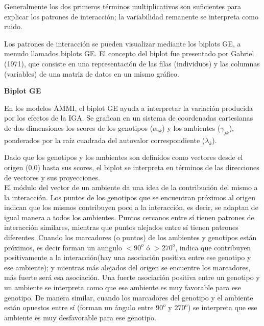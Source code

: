 Generalmente los dos primeros términos multiplicativos son suficientes para explicar los patrones de interacción; la variabilidad remanente se interpreta como ruido. 

Los patrones de interacción se pueden visualizar mediante los biplots GE, a menudo llamados biplots GE. El concepto del biplot fue presentado por Gabriel (1971), que consiste en una representación de las filas (individuos) y las columnas (variables) de una matriz de datos en un mismo gráfico. 

\textbf{Biplot GE}

En los modelos AMMI, el biplot GE ayuda a interpretar la variación producida por los efectos de la IGA. Se grafican en un sistema de coordenadas cartesianas de dos dimensiones los scores de los genotipos ($\alpha_{ik}$) y los ambientes ($\gamma_{jk}$), ponderados por la raíz cuadrada del autovalor correspondiente ($\lambda_k$).

Dado que los genotipos y los ambientes son definidos como vectores desde el origen (0,0) hasta sus scores, el biplot se interpreta en términos de las direcciones de vectores y sus proyecciones.\\

El módulo del vector de un ambiente da una idea de la contribución del mismo a la interacción. Los puntos de los genotipos que se encuentran próximos al origen indican que los mismos contribuyen poco a la interacción, es decir, se adaptan de igual manera a todos los ambientes. Puntos cercanos entre sí tienen patrones de interacción similares, mientras que puntos alejados entre sí tienen patrones diferentes. Cuando los marcadores (o puntos) de los ambientes y genotipos están próximos, es decir forman un aungulo $< 90^o$ ó $> 270^o$, indica que contribuyen positivamente a la interacción(hay una asociación positiva entre ese genotipo y ese ambiente); y mientras más alejados del origen se encuentre los marcadores, más fuerte será esa asociación. Una fuerte asociación positiva entre un genotipo y un ambiente se interpreta como que ese ambiente es muy favorable para ese genotipo. De manera similar, cuando los marcadores del genotipo y el ambiente están opuestos entre sí (forman un ángulo entre $90^o$ y $270^o$) se interpreta que ese ambiente es muy desfavorable para ese genotipo.\\


